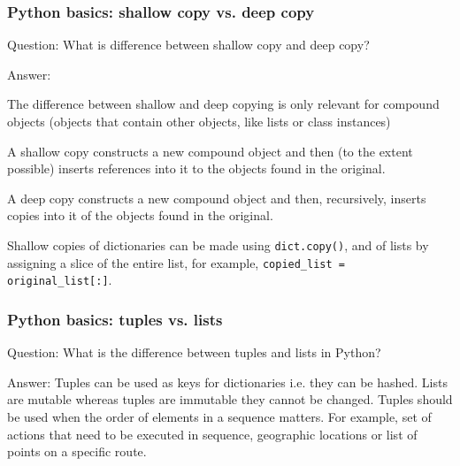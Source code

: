 \documentclass[11pt]{beamer}
\begin{document}
\begin{frame}
\frametitle{Python basics: shallow copy vs. deep copy}
\begin{block}{Question:}
	What is difference between shallow copy and deep copy?
\end{block}
\begin{block}{Answer:}
	
	The difference between shallow and deep copying is only relevant for compound objects (objects that contain other objects, like lists or class instances)
	
	A shallow copy constructs a new compound object and then (to the extent possible) inserts references into it to the objects found in the original.
	
	A deep copy constructs a new compound object and then, recursively, inserts copies into it of the objects found in the original.
	
	Shallow copies of dictionaries can be made using \texttt{dict.copy()}, and of lists by assigning a slice of the entire list, for example, \texttt{copied\_list = original\_list[:]}.
\end{block}
\end{frame}

\begin{frame}
\frametitle{Python basics: tuples vs. lists}
\begin{block}{Question:}
	What is the difference between tuples and lists in Python?
\end{block}
\begin{block}{Answer:}
	Tuples can be used as keys for dictionaries i.e. they can be hashed. Lists are mutable whereas tuples are immutable  they cannot be changed. Tuples should be used when the order of elements in a sequence matters. For example, set of actions that need to be executed in sequence, geographic locations or list of points on a specific route.
\end{block}
\end{frame}
\end{document}
